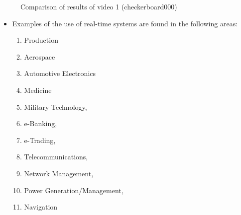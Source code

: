 \begin{figure}
    \qquad
    \qquad
    \qquad
    \caption{ Comparison of results of video 1 (checkerboard000)}%
    \label{v1}%
\end{figure}


\begin{itemize}
	\item Examples of the use of real-time systems are found in the following areas: 
	\begin{enumerate}
		\item  Production 
		\item  Aerospace 
		\item  Automotive Electronics
		\item  Medicine
		\item  Military Technology, 
		\item  e-Banking, 
		\item  e-Trading, 
		\item  Telecommunications, 
		\item  Network Management, 
		\item  Power Generation/Management, 
		\item  Navigation
	\end{enumerate}
\end{itemize}

